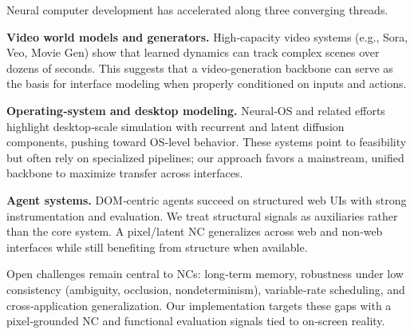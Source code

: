 Neural computer development has accelerated along three converging threads.

\textbf{Video world models and generators.}
High‑capacity video systems (e.g., Sora, Veo, Movie Gen) show that learned dynamics can track complex scenes over dozens of seconds.
This suggests that a video‑generation backbone can serve as the basis for interface modeling when properly conditioned on inputs and actions.

\textbf{Operating‑system and desktop modeling.}
Neural‑OS and related efforts highlight desktop‑scale simulation with recurrent and latent diffusion components, pushing toward OS‑level behavior.
These systems point to feasibility but often rely on specialized pipelines; our approach favors a mainstream, unified backbone to maximize transfer across interfaces.

\textbf{Agent systems.}
DOM‑centric agents succeed on structured web UIs with strong instrumentation and evaluation.
We treat structural signals as auxiliaries rather than the core system.
A pixel/latent NC generalizes across web and non‑web interfaces while still benefiting from structure when available.

Open challenges remain central to NCs: long‑term memory, robustness under low consistency (ambiguity, occlusion, nondeterminism), variable‑rate scheduling, and cross‑application generalization.
Our implementation targets these gaps with a pixel‑grounded NC and functional evaluation signals tied to on‑screen reality.
